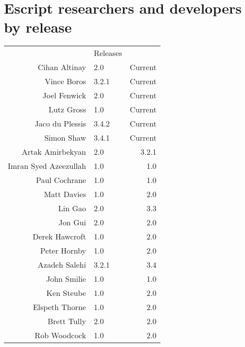 
%
%
%

\chapter{Escript researchers and developers by release}

\begin{center}
\begin{tabular}{r|lr|}
& Releases\\ \cline{2-3}
Cihan Altinay & 2.0 & Current \\
Vince Boros & 3.2.1 & Current \\
Joel Fenwick & 2.0 & Current \\
Lutz Gross & 1.0 & Current \\
Jaco du Plessis & 3.4.2 & Current \\
Simon Shaw & 3.4.1 & Current \\
Artak Amirbekyan & 2.0 & 3.2.1 \\
Imran Syed Azeezullah & 1.0 & 1.0 \\
Paul Cochrane & 1.0 & 1.0 \\
Matt Davies & 1.0 & 2.0 \\
Lin Gao & 2.0 & 3.3 \\
Jon Gui & 2.0 & 2.0 \\
Derek Hawcroft & 1.0 & 2.0 \\
Peter Hornby & 1.0 & 2.0 \\
Azadeh Salehi & 3.2.1 & 3.4 \\
John Smilie & 1.0 & 1.0 \\
Ken Steube & 1.0 & 2.0 \\
Elspeth Thorne & 1.0 & 2.0 \\
Brett Tully & 2.0 & 2.0 \\
Rob Woodcock & 1.0 & 2.0 \\
\cline{2-3}
\end{tabular}
\end{center}
